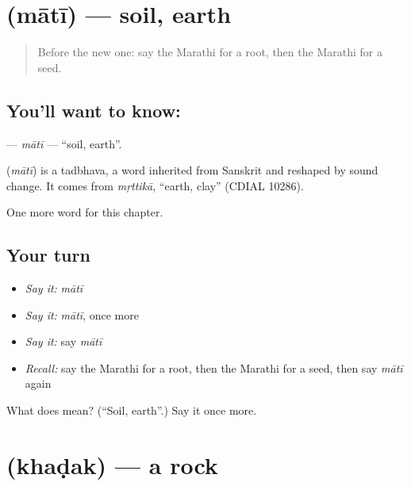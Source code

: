 \section[\texorpdfstring{\mr{माती} (mātī)}{माती (mātī)}]{ (mātī) — soil, earth}

\label{lesson:MR-C140-mati}



\begin{quote}
Before the new one: say the Marathi for a root, then the Marathi for a seed.
\end{quote}

\subsection*{You'll want to know: }
\textbf{} — \emph{mātī} — \textquotedblleft{}soil, earth\textquotedblright{}.

\begin{cousinweb}
\textbf{} (\emph{mātī}) is a tadbhava, a word inherited from Sanskrit and reshaped by sound change. It comes from \emph{mṛttikā}, \textquotedblleft{}earth, clay\textquotedblright{} (CDIAL 10286).
\end{cousinweb}

\begin{grammarlens}[title={What you've built}]
One more word for this chapter.
\end{grammarlens}

\subsection*{Your turn}
\begin{itemize}
\raggedright
  \item \emph{Say it:} \emph{mātī}
  \item \emph{Say it:} \emph{mātī}, once more
  \item \emph{Say it:} say \emph{mātī}
  \item \emph{Recall:} say the Marathi for a root, then the Marathi for a seed, then say \emph{mātī} again
\end{itemize}

\begin{tcolorbox}[breakable,colback=teal!4,colframe=teal!35!black,title={Before you move on}]
What does  mean? (\textquotedblleft{}Soil, earth\textquotedblright{}.) Say it once more.
\end{tcolorbox}
\section[\texorpdfstring{\mr{खडक} (khaḍak)}{खडक (khaḍak)}]{ (khaḍak) — a rock}

